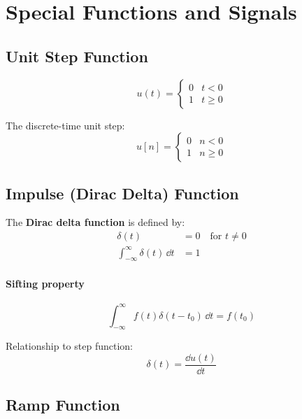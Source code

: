 \chapter{Special Functions and Signals}
\label{ch:special_functions}

\section{Unit Step Function}

\begin{equation}
u(t) = \begin{cases} 0 & t < 0 \\ 1 & t \geq 0 \end{cases}
\end{equation}

The discrete-time unit step:
\begin{equation}
u[n] = \begin{cases} 0 & n < 0 \\ 1 & n \geq 0 \end{cases}
\end{equation}

\section{Impulse (Dirac Delta) Function}

The \textbf{Dirac delta function} is defined by:
\begin{align}
\delta(t) &= 0 \quad \text{for } t \neq 0 \\
\int_{-\infty}^{\infty} \delta(t) \, \dd t &= 1
\end{align}

\subsubsection{Sifting property}
\begin{equation}
\int_{-\infty}^{\infty} f(t)\delta(t-t_0) \, \dd t = f(t_0)
\end{equation}

Relationship to step function:
\begin{equation}
\delta(t) = \frac{\dd u(t)}{\dd t}
\end{equation}

\section{Ramp Function}

